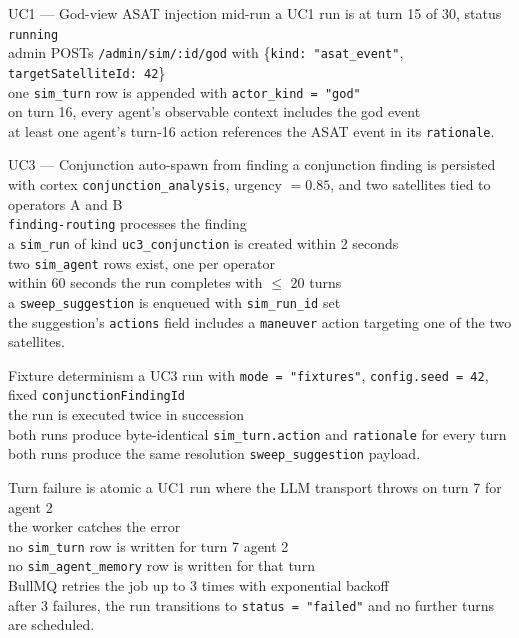 \begin{scenario}{UC1 --- God-view ASAT injection mid-run}
\Given a UC1 run is at turn 15 of 30, status \texttt{running} \\
\When admin POSTs \texttt{/admin/sim/:id/god} with \{\texttt{kind: "asat\_event"}, \texttt{targetSatelliteId: 42}\} \\
\Then one \texttt{sim\_turn} row is appended with \texttt{actor\_kind = "god"} \\
\And on turn 16, every agent's observable context includes the god event \\
\And at least one agent's turn-16 action references the ASAT event in its \texttt{rationale}.
\end{scenario}

\begin{scenario}{UC3 --- Conjunction auto-spawn from finding}
\Given a conjunction finding is persisted with cortex \texttt{conjunction\_analysis}, urgency $= 0.85$, and two satellites tied to operators A and B \\
\When \texttt{finding-routing} processes the finding \\
\Then a \texttt{sim\_run} of kind \texttt{uc3\_conjunction} is created within 2 seconds \\
\And two \texttt{sim\_agent} rows exist, one per operator \\
\And within 60 seconds the run completes with $\leq$ 20 turns \\
\And a \texttt{sweep\_suggestion} is enqueued with \texttt{sim\_run\_id} set \\
\And the suggestion's \texttt{actions} field includes a \texttt{maneuver} action targeting one of the two satellites.
\end{scenario}

\begin{scenario}{Fixture determinism}
\Given a UC3 run with \texttt{mode = "fixtures"}, \texttt{config.seed = 42}, fixed \texttt{conjunctionFindingId} \\
\When the run is executed twice in succession \\
\Then both runs produce byte-identical \texttt{sim\_turn.action} and \texttt{rationale} for every turn \\
\And both runs produce the same resolution \texttt{sweep\_suggestion} payload.
\end{scenario}

\begin{scenario}{Turn failure is atomic}
\Given a UC1 run where the LLM transport throws on turn 7 for agent 2 \\
\When the worker catches the error \\
\Then no \texttt{sim\_turn} row is written for turn 7 agent 2 \\
\And no \texttt{sim\_agent\_memory} row is written for that turn \\
\And BullMQ retries the job up to 3 times with exponential backoff \\
\And after 3 failures, the run transitions to \texttt{status = "failed"} and no further turns are scheduled.
\end{scenario}

